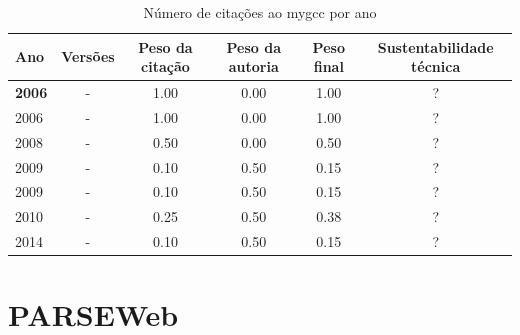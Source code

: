 \begin{table}[H]
\caption{Número de citações ao mygcc por ano}
\centering
\begin{tabular}{| l | c | c | c | c | c |}
  \hline
  Ano & Versões & Peso da citação & Peso da autoria & Peso final & Sustentabilidade técnica \\
  \hline
            {\bf 2006}
          &
          -
          &
          1.00
          &
          0.00
          &
            {\color{blue} 1.00}
          &
          ?
          \\
            2006
          &
          -
          &
          1.00
          &
          0.00
          &
            {\color{blue} 1.00}
          &
          ?
          \\
\hline
            2008
          &
          -
          &
          0.50
          &
          0.00
          &
            {\color{blue} 0.50}
          &
          ?
          \\
\hline
            2009
          &
          -
          &
          0.10
          &
          0.50
          &
            {\color{red} 0.15}
          &
          ?
          \\
            2009
          &
          -
          &
          0.10
          &
          0.50
          &
            {\color{red} 0.15}
          &
          ?
          \\
\hline
            2010
          &
          -
          &
          0.25
          &
          0.50
          &
            {\color{red} 0.38}
          &
          ?
          \\
\hline
            2014
          &
          -
          &
          0.10
          &
          0.50
          &
            {\color{red} 0.15}
          &
          ?
          \\
\hline
\end{tabular}
\end{table}



\section{PARSEWeb}



